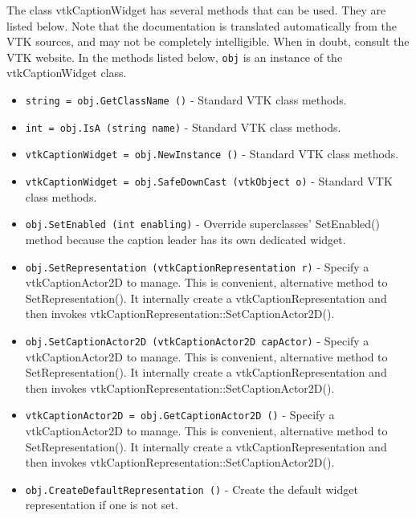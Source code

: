 The class vtkCaptionWidget has several methods that can be used.
  They are listed below.
Note that the documentation is translated automatically from the VTK sources,
and may not be completely intelligible.  When in doubt, consult the VTK website.
In the methods listed below, \verb|obj| is an instance of the vtkCaptionWidget class.
\begin{itemize}
\item  \verb|string = obj.GetClassName ()| -  Standard VTK class methods.

\item  \verb|int = obj.IsA (string name)| -  Standard VTK class methods.

\item  \verb|vtkCaptionWidget = obj.NewInstance ()| -  Standard VTK class methods.

\item  \verb|vtkCaptionWidget = obj.SafeDownCast (vtkObject o)| -  Standard VTK class methods.

\item  \verb|obj.SetEnabled (int enabling)| -  Override superclasses' SetEnabled() method because the caption leader
 has its own dedicated widget.

\item  \verb|obj.SetRepresentation (vtkCaptionRepresentation r)| -  Specify a vtkCaptionActor2D to manage. This is convenient, alternative
 method to SetRepresentation(). It internally create a vtkCaptionRepresentation
 and then invokes vtkCaptionRepresentation::SetCaptionActor2D().

\item  \verb|obj.SetCaptionActor2D (vtkCaptionActor2D capActor)| -  Specify a vtkCaptionActor2D to manage. This is convenient, alternative
 method to SetRepresentation(). It internally create a vtkCaptionRepresentation
 and then invokes vtkCaptionRepresentation::SetCaptionActor2D().

\item  \verb|vtkCaptionActor2D = obj.GetCaptionActor2D ()| -  Specify a vtkCaptionActor2D to manage. This is convenient, alternative
 method to SetRepresentation(). It internally create a vtkCaptionRepresentation
 and then invokes vtkCaptionRepresentation::SetCaptionActor2D().

\item  \verb|obj.CreateDefaultRepresentation ()| -  Create the default widget representation if one is not set. 

\end{itemize}

